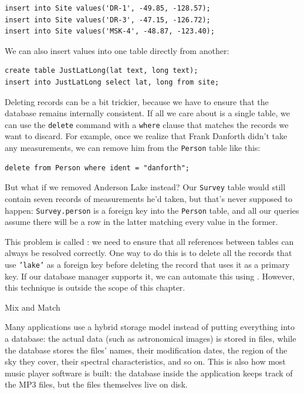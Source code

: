\documentclass{book}
\begin{document}
\begin{verbatim}
insert into Site values('DR-1', -49.85, -128.57);
insert into Site values('DR-3', -47.15, -126.72);
insert into Site values('MSK-4', -48.87, -123.40);
\end{verbatim}

We can also insert values into one table directly from another:

\begin{verbatim}
create table JustLatLong(lat text, long text);
insert into JustLatLong select lat, long from site;
\end{verbatim}

Deleting records can be a bit trickier, because we have to ensure that
the database remains internally consistent. If all we care about is a
single table, we can use the \texttt{delete} command with a
\texttt{where} clause that matches the records we want to discard. For
example, once we realize that Frank Danforth didn't take any
measurements, we can remove him from the \texttt{Person} table like
this:

\begin{verbatim}
delete from Person where ident = "danforth";
\end{verbatim}

But what if we removed Anderson Lake instead? Our \texttt{Survey} table
would still contain seven records of measurements he'd taken, but that's
never supposed to happen: \texttt{Survey.person} is a foreign key into
the \texttt{Person} table, and all our queries assume there will be a
row in the latter matching every value in the former.

This problem is called : we need to ensure that all references between tables can
always be resolved correctly. One way to do this is to delete all the
records that use \texttt{'lake'} as a foreign key before deleting the
record that uses it as a primary key. If our database manager supports
it, we can automate this using . However, this technique is outside the scope of this chapter.

\begin{swcbox}{Mix and Match}

Many applications use a hybrid storage model instead of putting
everything into a database: the actual data (such as astronomical
images) is stored in files, while the database stores the files' names,
their modification dates, the region of the sky they cover, their
spectral characteristics, and so on. This is also how most music player
software is built: the database inside the application keeps track of
the MP3 files, but the files themselves live on disk.

\end{swcbox}
\end{document}
